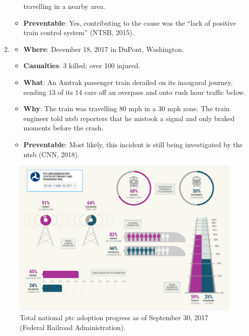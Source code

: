 \documentclass[11pt, titlepage]{article}
\begin{document}
\begin{enumerate}
\begin{itemize}
        travelling in a nearby area.
        \item \textbf{Preventable}: Yes, contributing to the cause was the ``lack
        of positive train control system'' (NTSB, 2015).
    \end{itemize}
    \item
    \begin{itemize}
        \item \textbf{Where}: December 18, 2017 in DuPont, Washington.
        \item \textbf{Casualties}: 3 killed; over 100 injured.
        \item \textbf{What}: An Amtrak passenger train derailed on its inaugural
        journey, sending 13 of its 14 cars off an overpass and onto rush hour
        traffic below.
        \item \textbf{Why}: The train was travelling 80 mph in a 30 mph zone. The
        train engineer told \gls{ntsb} reporters that he mistook a signal and
        only braked moments before the crash.
        \item \textbf{Preventable}: Most likely, this incident is still being
        investigated by the \gls{ntsb} (CNN, 2018).
    \end{itemize}
\end{enumerate}

\begin{figure}[ht]
    \begin{center}
        \includegraphics[width=\textwidth]{PTCAdoption.png}
        \captionsetup{justification=centering}
        \caption[National PTC Adoption]{Total national \gls{ptc} adoption progress as of September 30, 2017
        (Federal Railroad Administration).}
        \label{adoption}
    \end{center}
\end{figure}
\end{document}
